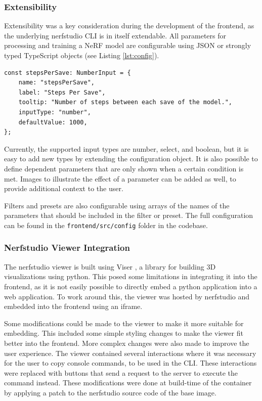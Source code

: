 \subsubsection{Extensibility}

Extensibility was a key consideration during the development of the frontend, as the underlying nerfstudio CLI is in itself extendable.
All parameters for processing and training a NeRF model are configurable using JSON or strongly typed TypeScript objects (see Listing \ref{lst:config}).

\begin{lstlisting}[style=ES6, caption=Minimal parameter configuration for 'Steps Per Save' input., label=lst:config]
const stepsPerSave: NumberInput = {
	name: "stepsPerSave",
	label: "Steps Per Save",
	tooltip: "Number of steps between each save of the model.",
	inputType: "number",
	defaultValue: 1000,
};
\end{lstlisting}

Currently, the supported input types are number, select, and boolean, but it is easy to add new types by extending the configuration object.
It is also possible to define dependent parameters that are only shown when a certain condition is met.
Images to illustrate the effect of a parameter can be added as well, to provide additional context to the user.

Filters and presets are also configurable using arrays of the names of the parameters that should be included in the filter or preset.
The full configuration can be found in the \texttt{frontend/src/config} folder in the codebase.

\subsubsection{Nerfstudio Viewer Integration}

The nerfstudio viewer is built using Viser \cite{noauthor_nerfstudio-projectviser_2024}, a library for building 3D visualizations using python.
This posed some limitations in integrating it into the frontend, as it is not easily possible to directly embed a python application into a web application.
To work around this, the viewer was hosted by nerfstudio and embedded into the frontend using an iframe.

Some modifications could be made to the viewer to make it more suitable for embedding.
This included some simple styling changes to make the viewer fit better into the frontend.
More complex changes were also made to improve the user experience.
The viewer contained several interactions where it was necessary for the user to copy console commands, to be used in the CLI.
These interactions were replaced with buttons that send a request to the server to execute the command instead.
These modifications were done at build-time of the container by applying a patch to the nerfstudio source code of the base image.

